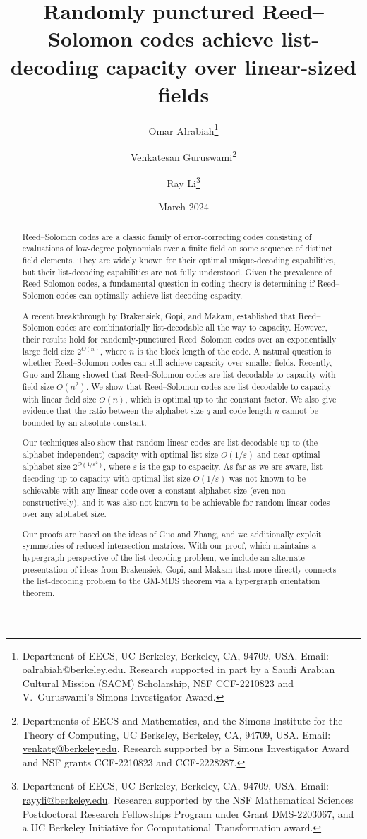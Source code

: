 \documentclass{article}[11pt]
\title{Randomly punctured Reed--Solomon codes achieve list-decoding capacity over linear-sized fields}
\author{Omar Alrabiah\thanks{Department of EECS, UC Berkeley, Berkeley, CA, 94709, USA. Email: \url{oalrabiah@berkeley.edu}. Research supported in part by a Saudi Arabian Cultural Mission (SACM) Scholarship, NSF CCF-2210823 and V.\ Guruswami's Simons Investigator Award.} \and Venkatesan Guruswami\thanks{Departments of EECS and Mathematics, and the Simons Institute for the Theory of Computing, UC Berkeley, Berkeley, CA, 94709, USA. Email: \url{venkatg@berkeley.edu}. Research supported by a Simons Investigator Award and NSF grants CCF-2210823 and CCF-2228287.}  \and Ray Li\thanks{Department of EECS, UC Berkeley, Berkeley, CA, 94709, USA. Email: \url{rayyli@berkeley.edu}. Research supported by the NSF Mathematical Sciences Postdoctoral Research Fellowships Program under Grant DMS-2203067, and a UC Berkeley Initiative for Computational Transformation award.} }
\date{March 2024}
\begin{document}
\maketitle
\thispagestyle{empty}

\begin{abstract}
  Reed--Solomon codes are a classic family of error-correcting codes consisting of evaluations of low-degree polynomials over a finite field on some sequence of distinct field elements. They are widely known for their optimal unique-decoding capabilities, but their list-decoding capabilities are not fully understood. Given the prevalence of Reed-Solomon codes, a fundamental question in coding theory is determining if Reed--Solomon codes can optimally achieve list-decoding capacity.
  
  A recent breakthrough by Brakensiek, Gopi, and Makam, established that Reed--Solomon codes are combinatorially list-decodable all the way to capacity. However, their results hold for randomly-punctured Reed--Solomon codes over an exponentially large field size $2^{O(n)}$, where $n$ is the block length of the code. A natural question is whether Reed--Solomon codes can still achieve capacity over smaller fields. Recently, Guo and Zhang showed that Reed--Solomon codes are list-decodable to capacity with field size $O(n^2)$. We show that Reed--Solomon codes are list-decodable to capacity with linear field size $O(n)$, which is optimal up to the constant factor. We also give evidence that the ratio between the alphabet size $q$ and code length $n$ cannot be bounded by an absolute constant. 
  
  Our techniques also show that random linear codes are list-decodable up to (the alphabet-independent) capacity with optimal list-size $O(1/\varepsilon)$ and near-optimal alphabet size $2^{O(1/\varepsilon^2)}$, where $\varepsilon$ is the gap to capacity. As far as we are aware, list-decoding up to capacity with optimal list-size $O(1/\varepsilon)$ was not known to be achievable with any linear code over a constant alphabet size (even non-constructively), and it was also not known to be achievable for random linear codes over any alphabet size.

  Our proofs are based on the ideas of Guo and Zhang, and we additionally exploit symmetries of reduced intersection matrices. With our proof, which maintains a hypergraph perspective of the list-decoding problem, we include an alternate presentation of ideas from Brakensiek, Gopi, and Makam that more directly connects the list-decoding problem to the GM-MDS theorem via a hypergraph orientation theorem.
\end{abstract}
\end{document}

